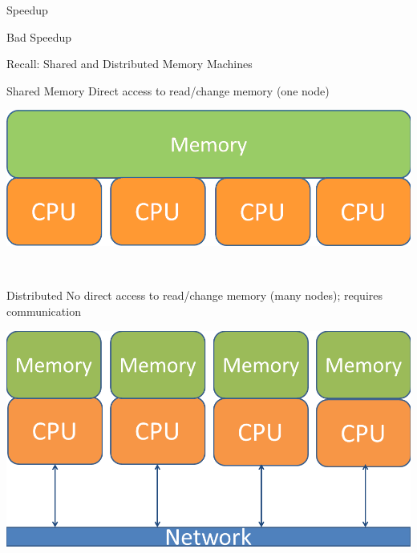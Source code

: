 \begin{frame}
\begin{block}{Speedup}
\begin{center}
\begin{minipage}{.475\textwidth}
\begin{block}{Bad Speedup}
    \end{block}
    \end{minipage}
    \end{center}
    \end{block}
\end{frame}


\begin{frame}
  \begin{block}{Recall: Shared and Distributed Memory Machines}
   \begin{center}
    \begin{minipage}{.475\textwidth}
    \begin{block}{Shared Memory}
     Direct access to read/change memory (one node) \vspace{.3cm} \ 
      \begin{center}
      \includegraphics[width=.95\textwidth]{../common/pics/arch_shared}
      \end{center}
      \vspace{.3cm} \
    \end{block}
    \end{minipage}
    \hspace{.1cm}
    \begin{minipage}{.475\textwidth}
    \begin{block}{Distributed}
    No direct access to read/change memory (many nodes); requires communication
      \begin{center}
      \includegraphics[width=.95\textwidth]{../common/pics/arch_distributed}
      \end{center}
    \end{block}
    \end{minipage}
    \end{center}
    \end{block}
\end{frame}



